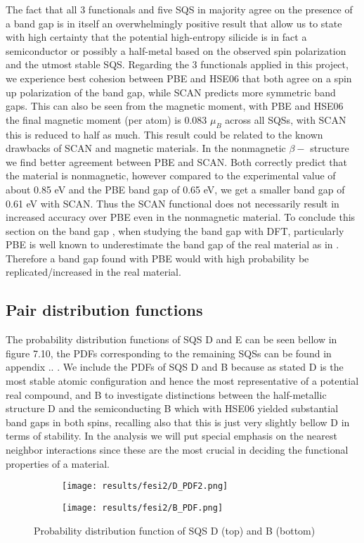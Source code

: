 The fact that all 3 functionals and five SQS in majority agree on the presence of a band gap is in itself an overwhelmingly positive result that allow us to state with high certainty that the potential high-entropy silicide  is in fact a semiconductor or possibly a half-metal based on the observed spin polarization and the utmost stable SQS. Regarding the 3 functionals applied in this project, we experience best cohesion between PBE and HSE06 that both agree on a spin up polarization of the band gap, while SCAN predicts more symmetric band gaps. This can also be seen from the magnetic moment, with PBE and HSE06 the final magnetic moment (per atom) is 0.083 $\mu_B$ across all SQSs, with SCAN this is reduced to half as much. This result could be related to the known drawbacks of SCAN and magnetic materials. In the nonmagnetic $\beta-$  structure we find better agreement between PBE and SCAN. Both correctly predict that the material is nonmagnetic, however compared to the experimental value of about 0.85 eV and the PBE band gap of 0.65 eV, we get a smaller band gap of 0.61 eV with SCAN. Thus the SCAN functional does not necessarily result in increased accuracy over PBE even in the nonmagnetic material. To conclude this section on the band gap , when studying the band gap with DFT, particularly PBE is well known to underestimate the band gap of the real material as in . Therefore a band gap found with PBE would with high probability be replicated/increased in the real material. 
 
\newpage 
\subsection{Pair distribution functions}
The probability distribution functions of SQS D and E can be seen bellow in figure 7.10, the PDFs corresponding to the remaining SQSs can be found in appendix .. . We include the PDFs of SQS D and B because as stated D is the most stable atomic configuration and hence the most representative of a potential real compound, and B to investigate distinctions between the half-metallic structure D and the semiconducting B which with HSE06 yielded substantial band gaps in both spins, recalling also that this is just very slightly bellow D in terms of stability. In the analysis we will put special emphasis on the nearest neighbor interactions since these are the most crucial in deciding the functional properties of a material. 
 
\begin{figure}[H]
	\centering
	\begin{subfigure}{\textwidth}
		\texttt{[image: results/fesi2/D\_PDF2.png]}
	\end{subfigure}
	\begin{subfigure}{\textwidth}
		\texttt{[image: results/fesi2/B\_PDF.png]}
	\end{subfigure}
	\caption{Probability distribution function of SQS D (top) and B (bottom)}
\end{figure}

